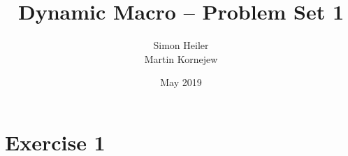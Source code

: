 \documentclass[a4paper,12pt,american]{article}
\title{Dynamic Macro -- Problem Set 1}
\author{\normalsize Simon Heiler \\ \normalsize Martin Kornejew}
\date{May 2019}
\begin{document}
\maketitle

\section*{Exercise 1}




\appendix
\printbibliography
\end{document}
